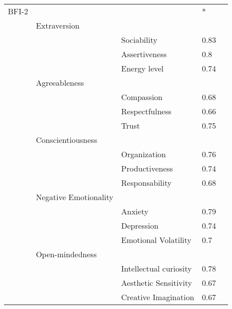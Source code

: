 \documentclass[]{article}
\begin{document}
\begin{longtable}{@{\extracolsep{\fill}}*5{l}}
BFI-2    &                       &                        & *           &        \\
         & Extraversion          &                        &             &         \\
         &                       & Sociability            & 0.83        &         \\
         &                       & Assertiveness          & 0.8         &         \\
         &                       & Energy level           & 0.74        &         \\
         & Agreeableness         &                        &             &         \\
         &                       & Compassion             & 0.68        &         \\
         &                       & Respectfulness         & 0.66        &         \\
         &                       & Trust                  & 0.75        &         \\
         & Conscientiousness     &                        &             &         \\
         &                       & Organization           & 0.76        &         \\
         &                       & Productiveness         & 0.74        &         \\
         &                       & Responsability         & 0.68        &         \\
         & Negative Emotionality &                        &             &         \\
         &                       & Anxiety                & 0.79        &         \\
         &                       & Depression             & 0.74        &         \\
         &                       & Emotional Volatility   & 0.7         &         \\
         & Open-mindedness       &                        &             &         \\
         &                       & Intellectual curiosity & 0.78        &         \\
         &                       & Aesthetic Sensitivity  & 0.67        &         \\
         &                       & Creative Imagination   & 0.67        &         \\[1cm]    


\end{longtable}
\end{document}
